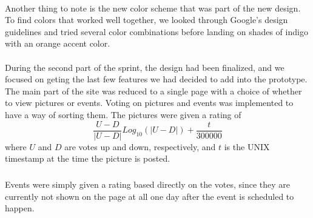 \paragraph{} Another thing to note is the new color scheme that was part of the new design. To find colors that worked well together, we looked through Google's design guidelines and tried several color combinations before landing on shades of indigo with an orange accent color.

\paragraph{} During the second part of the sprint, the design had been finalized, and we focused on geting the last few features we had decided to add into the prototype. The main part of the site was reduced to a single page with a choice of whether to view pictures or events. Voting on pictures and events was implemented to have a way of sorting them. The pictures were given a rating of 
\begin{equation}
\frac{U-D}{|U-D|} Log_{10}(|U-D|) + \frac{t}{300000}
\end{equation}
where $U$ and $D$ are votes up and down, respectively, and $t$ is the UNIX timestamp at the time the picture is posted.
\subparagraph{} Events were simply given a rating based directly on the votes, since they are currently not shown on the page at all one day after the event is scheduled to happen.


